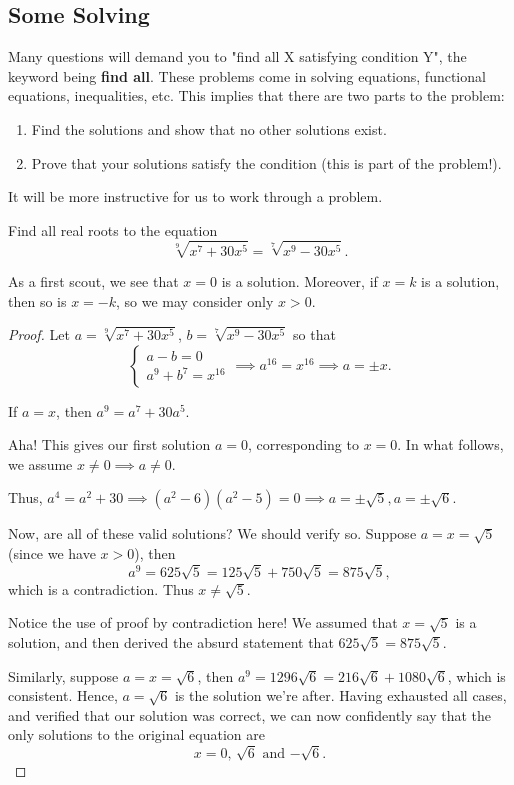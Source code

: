 \documentclass[../main.tex]{subfiles}
\begin{document}
\subsection{Some Solving}
Many questions will demand you to "find all X satisfying condition Y", the keyword being \textbf{find all}. These problems come in solving equations, functional equations, inequalities, etc. This implies that there are two parts to the problem: 
\begin{enumerate}
    \item Find the solutions and show that no other solutions exist.
    \item Prove that your solutions satisfy the condition (this is part of the problem!).
\end{enumerate}
It will be more instructive for us to work through a problem.

\begin{example}[2021 SMO(O) P10]
Find all real roots to the equation
$$\sqrt[9]{x^7+30x^5}=\sqrt[7]{x^9-30x^5}.$$
\end{example}
As a first scout, we see that $x=0$ is a solution. Moreover, if $x=k$ is a solution, then so is $x=-k$, so we may consider only $x > 0$.
\begin{proof}
Let $a=\sqrt[9]{x^7+30x^5}$, $b=\sqrt[7]{x^9-30x^5}$ so that
$$\begin{cases}
    a-b=0 \\
    a^9+b^7=x^{16}
\end{cases}
\implies
a^{16}=x^{16} \implies a=\pm x.$$

If $a=x$, then $a^9=a^7+30a^5.$ 

Aha! This gives our first solution $a=0$, corresponding to $x=0$. In what follows, we assume $x\neq 0 \implies a\neq 0$.

Thus, $a^4=a^2+30 \implies (a^2-6)(a^2-5)=0 \implies a=\pm \sqrt{5}, a=\pm \sqrt{6}$.

Now, are all of these valid solutions? We should verify so. Suppose $a=x=\sqrt{5}$ (since we have $x>0$), then 
$$a^9=625\sqrt{5}=125\sqrt{5}+750\sqrt{5}=875\sqrt{5},$$ which is a contradiction. Thus $x\neq \sqrt{5}$.
\begin{remark}
Notice the use of proof by contradiction here! We assumed that $x=\sqrt{5}$ is a solution, and then derived the absurd statement that $625\sqrt{5}=875\sqrt{5}$.
\end{remark}
Similarly, suppose $a=x=\sqrt{6}$, then $a^9=1296\sqrt{6}=216\sqrt{6}+1080\sqrt{6}$, which is consistent. Hence, $a=\sqrt{6}$ is the solution we're after. Having exhausted all cases, and verified that our solution was correct, we can now confidently say that the only solutions to the original equation are $$\boxed{\text{$x=0$, $\sqrt{6}$ and $-\sqrt{6}$}}.$$
\end{proof}
\end{document}
